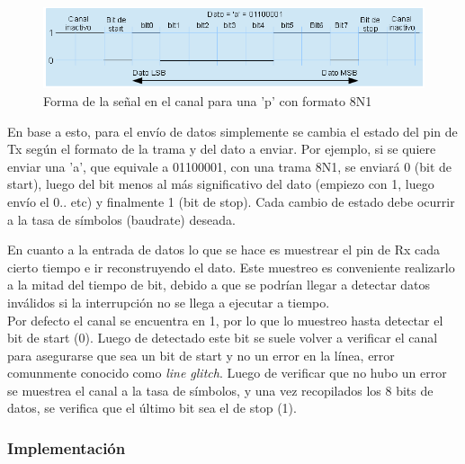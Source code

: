 \begin{figure}[!ht]
	\centering
	\includegraphics[width=16cm,scale=1]{resources/3_8-datoSerie.png}
	\caption{Forma de la señal en el canal para una 'p' con formato 8N1}
	\label{fig:\thefigure}
\end{figure}


En base a esto, para el envío de datos simplemente se cambia el estado del pin de Tx según el formato de la trama y del dato a enviar. Por ejemplo, si se quiere enviar una 'a', que equivale a 01100001, con una trama 8N1, se enviará 0 (bit de start), luego del bit menos al más significativo del dato (empiezo con 1, luego envío el 0.. etc) y finalmente 1 (bit de stop). Cada cambio de estado debe ocurrir a la tasa de símbolos (baudrate) deseada.

En cuanto a la entrada de datos lo que se hace es muestrear el pin de Rx cada cierto tiempo e ir reconstruyendo el dato. Este muestreo es conveniente realizarlo a la mitad del tiempo de bit, debido a que se podrían llegar a detectar datos inválidos si la interrupción no se llega a ejecutar a tiempo.\\
Por defecto el canal se encuentra en 1, por lo que lo muestreo hasta detectar el bit de start (0). Luego de detectado este bit se suele volver a verificar el canal para asegurarse que sea un bit de start y no un error en la línea, error comunmente conocido como \textit{line glitch}. Luego de verificar que no hubo un error se muestrea el canal a la tasa de símbolos, y una vez recopilados los 8 bits de datos, se verifica que el último bit sea el de stop (1).

\subsubsection{Implementación}

